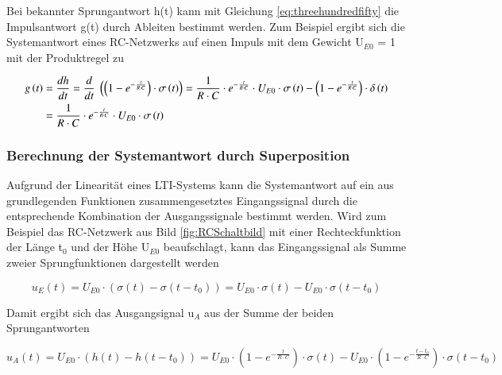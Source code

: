 \noindent Bei bekannter Sprungantwort h(t) kann mit Gleichung \eqref{eq:threehundredfifty} die Impulsantwort g(t) durch Ableiten bestimmt werden. Zum Beispiel ergibt sich die Systemantwort eines RC-Netzwerks auf einen Impuls mit dem Gewicht U${}_{E0}$ = 1 mit der Produktregel zu

\begin{equation}\label{eq:threehundredfiftyone}
\begin{split}
g\left(t\right) & = \frac{dh}{dt} =\frac{d}{dt} {\rm \; }\left(\left(1-e^{-\frac{t}{R\cdot C} } \right)\cdot \sigma \left(t\right)\right)=\frac{1}{R\cdot C} \cdot e^{-\frac{t}{R\cdot C} } \cdot U_{E0} \cdot \sigma \left(t\right)-\left(1-e^{-\frac{t}{R\cdot C} } \right)\cdot \delta \left(t\right) \\ 
& = {\frac{1}{R\cdot C} \cdot e^{-\frac{t}{R\cdot C} } \cdot U_{E0} \cdot \sigma \left(t\right)}    
\end{split}
\end{equation}

\subsubsection{Berechnung der Systemantwort durch Superposition}\label{threethreefive}

\noindent Aufgrund der Linearität eines LTI-Systems kann die Systemantwort auf ein aus grundlegenden Funktionen zusammengesetztes Eingangssignal durch die entsprechende Kombination der Ausgangssignale bestimmt werden. Wird zum Beispiel das RC-Netzwerk aus Bild \ref{fig:RCSchaltbild} mit einer Rechteckfunktion der Länge t${}_{0}$ und der Höhe U${}_{E0}$ beaufschlagt, kann das Eingangssignal als Summe zweier Sprungfunktionen dargestellt werden

\begin{equation}\label{eq:threehundredfiftytwo}
u_{E} \left(t\right)=U_{E0} \cdot \left(\sigma \left(t\right)-\sigma \left(t-t_{0} \right)\right)=U_{E0} \cdot \sigma \left(t\right)-U_{E0} \cdot \sigma \left(t-t_{0} \right)
\end{equation}

\noindent Damit ergibt sich das Ausgangsignal u${}_{A}$ aus der Summe der beiden Sprungantworten

\begin{equation}\label{eq:threehundredfiftythree}
u_{A} \left(t\right)=U_{E0} \cdot \left(h\left(t\right)-h\left(t-t_{0} \right)\right)=U_{E0} \cdot \left(1-e^{-\frac{t}{R\cdot C} } \right)\cdot \sigma \left(t\right)-U_{E0} \cdot \left(1-e^{-\frac{t-t_{0} }{R\cdot C} } \right)\cdot \sigma \left(t-t_{0} \right)
\end{equation}

